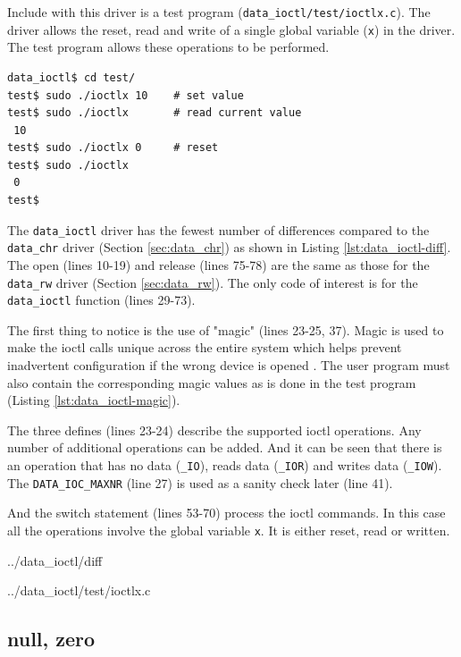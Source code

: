 \documentclass{article}
\begin{document}
Include with this driver is a test program (\verb+data_ioctl/test/ioctlx.c+).
The driver allows the reset, read and write of a single global variable
(\verb+x+) in the driver.
The test program allows these operations to be performed.

\begin{verbatim}
data_ioctl$ cd test/
test$ sudo ./ioctlx 10    # set value
test$ sudo ./ioctlx       # read current value
 10
test$ sudo ./ioctlx 0     # reset
test$ sudo ./ioctlx
 0
test$
\end{verbatim}

The \verb+data_ioctl+ driver has the fewest number of differences compared to
the \verb+data_chr+ driver (Section \ref{sec:data_chr}) as shown
in Listing \ref{lst:data_ioctl-diff}.
The open (lines 10-19) and release (lines 75-78) are the same as
those for the \verb+data_rw+ driver (Section \ref{sec:data_rw}).
The only code of interest is for the \verb+data_ioctl+ function (lines 29-73).

The first thing to notice is the use of "magic" (lines 23-25, 37).
Magic is used to make the ioctl calls unique across the entire system
which helps prevent inadvertent configuration if the wrong device is opened
\autocite[Pg. 158]{corbet2009linux}.
The user program must also contain the corresponding magic
values as is done in the test program (Listing \ref{lst:data_ioctl-magic}).

The three defines (lines 23-24) describe the supported ioctl operations.
Any number of additional operations can be added.
And it can be seen that there is an operation that has no data (\verb+_IO+),
reads data (\verb+_IOR+) and writes data (\verb+_IOW+).
The \verb+DATA_IOC_MAXNR+ (line 27) is used as a sanity check later (line 41).

And the switch statement (lines 53-70) process the ioctl commands.
In this case all the operations involve the global variable \verb+x+.
It is either reset, read or written.

\pagebreak

	{../data_ioctl/diff}


	{../data_ioctl/test/ioctlx.c}


\subsection{null, zero}
\end{document}
